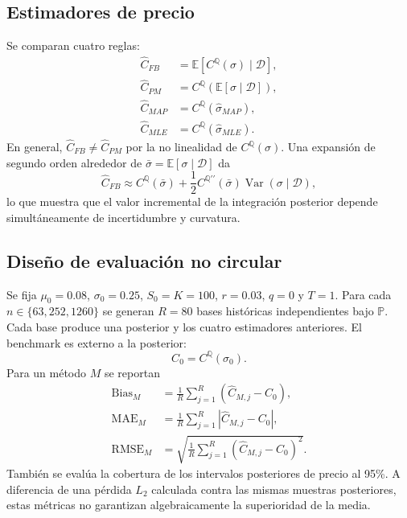 \documentclass[12pt,letterpaper]{article}
\newcommand{\Pmeasure}{\mathbb{P}}
\newcommand{\Qmeasure}{\mathbb{Q}}
\newcommand{\E}{\mathbb{E}}
\newcommand{\Var}{\operatorname{Var}}
\newcommand{\RMSE}{\operatorname{RMSE}}
\begin{document}
\subsection{Estimadores de precio}

Se comparan cuatro reglas:
\begin{align}
 \widehat C_{FB}
 &=\E[C^{\Qmeasure}(\sigma)\mid\mathcal D],\\
 \widehat C_{PM}
 &=C^{\Qmeasure}(\E[\sigma\mid\mathcal D]),\\
 \widehat C_{MAP}
 &=C^{\Qmeasure}(\widehat\sigma_{MAP}),\\
 \widehat C_{MLE}
 &=C^{\Qmeasure}(\widehat\sigma_{MLE}).
\end{align}
En general, $\widehat C_{FB}\neq\widehat C_{PM}$ por la no linealidad de $C^{\Qmeasure}(\sigma)$. Una expansión de segundo orden alrededor de $\bar\sigma=\E[\sigma\mid\mathcal D]$ da
\begin{equation}
 \widehat C_{FB}
 \approx
 C^{\Qmeasure}(\bar\sigma)
 +\frac12 C^{\Qmeasure\prime\prime}(\bar\sigma)
 \Var(\sigma\mid\mathcal D),
 \label{eq:curvature}
\end{equation}
lo que muestra que el valor incremental de la integración posterior depende simultáneamente de incertidumbre y curvatura.

\subsection{Diseño de evaluación no circular}

Se fija $\mu_0=0.08$, $\sigma_0=0.25$, $S_0=K=100$, $r=0.03$, $q=0$ y $T=1$. Para cada $n\in\{63,252,1260\}$ se generan $R=80$ bases históricas independientes bajo $\Pmeasure$. Cada base produce una posterior y los cuatro estimadores anteriores. El benchmark es externo a la posterior:
\begin{equation}
 C_0=C^{\Qmeasure}(\sigma_0).
\end{equation}
Para un método $M$ se reportan
\begin{align}
 \operatorname{Bias}_M&=\frac1R\sum_{j=1}^{R}(\widehat C_{M,j}-C_0),\\
 \operatorname{MAE}_M&=\frac1R\sum_{j=1}^{R}|\widehat C_{M,j}-C_0|,\\
 \RMSE_M&=\sqrt{\frac1R\sum_{j=1}^{R}(\widehat C_{M,j}-C_0)^2}.
\end{align}
También se evalúa la cobertura de los intervalos posteriores de precio al 95\%. A diferencia de una pérdida $L_2$ calculada contra las mismas muestras posteriores, estas métricas no garantizan algebraicamente la superioridad de la media.
\end{document}
